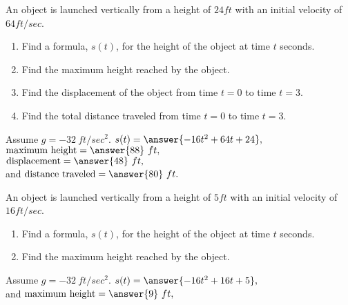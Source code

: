 \documentclass{ximera}
\begin{document}
\begin{problem}
An object is launched vertically from a height of $24 ft$ with an initial velocity of $64 ft/sec$.  
\begin{enumerate}
\item Find a formula, $s(t)$, for the height of the object at time $t$
 seconds.
\item Find the maximum height reached by the object.
\item Find the displacement of the object from time $t = 0$ to time $t = 3$.
\item Find the total distance traveled from time $t = 0$ to time $t = 3$.
\end{enumerate}
Assume $g = -32 \ ft/sec^2$.
$s(t) = \answer{-16t^2 + 64t + 24},$\\
$\text{maximum height} =\answer{88} \ ft,$\\
$\text{displacement} =\answer{48} \ ft,$\\
and
$\text{distance traveled} = \answer{80} \ ft.$
\end{problem}

\begin{problem}
An object is launched vertically from a height of $5 ft$ with an initial velocity of $16 ft/sec$.  
\begin{enumerate}
\item Find a formula, $s(t)$, for the height of the object at time $t$
 seconds.
\item Find the maximum height reached by the object.
\end{enumerate}
Assume $g = -32 \ ft/sec^2$.
$s(t) = \answer{-16t^2 + 16t + 5},$\\
and
$\text{maximum height} =\answer{9} \ ft,$\\


\end{problem}
\end{document}
